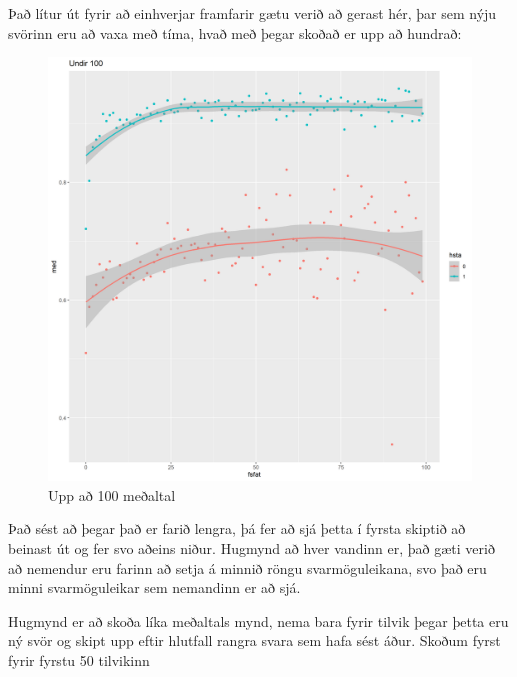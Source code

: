 \documentclass[
  12pt,
]{article}
\begin{document}
Það lítur út fyrir að einhverjar framfarir gætu verið að gerast hér, þar sem nýju svörinn eru að vaxa með tíma, hvað með þegar skoðað er upp að hundrað:

\begin{figure}[H]

{\centering \includegraphics[width=1\linewidth]{Imgsimplify/plotbymean100} 

}

\caption{Upp að 100 meðaltal}\label{fig:pltbymean100}
\end{figure}

Það sést að þegar það er farið lengra, þá fer að sjá þetta í fyrsta skiptið að beinast út og fer svo aðeins niður. Hugmynd að hver vandinn er, það gæti verið að nemendur eru farinn að setja á minnið röngu svarmöguleikana, svo það eru minni svarmöguleikar sem nemandinn er að sjá.

Hugmynd er að skoða líka meðaltals mynd, nema bara fyrir tilvik þegar þetta eru ný svör og skipt upp eftir hlutfall rangra svara sem hafa sést áður. Skoðum fyrst fyrir fyrstu 50 tilvikinn
\end{document}
